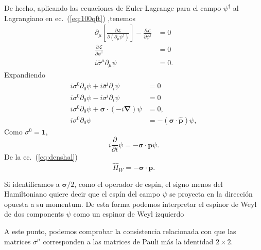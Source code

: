 \begin{frame}
De hecho, aplicando las ecuaciones de Euler-Lagrange para el campo $\psi^\dagger$ al Lagrangiano en ec.~(\ref{eq:100qft}) ,tenemos
\begin{align}
  \partial_\mu\left[\frac{\partial\mathcal{L}}{\partial\left(\partial_\mu\psi^\dagger\right)}\right]-\frac{\partial\mathcal{L}}{\partial\psi^\dagger}&=0\nonumber\\
  \frac{\partial\mathcal{L}}{\partial\psi^\dagger}&=0\nonumber\\
  \label{eq:114qftm}
  i \overline{\sigma}^\mu\partial_\mu\psi&=0.
\end{align}
Expandiendo
\begin{align*}
    i \sigma^0\partial_0\psi+i \overline{\sigma}^i\partial_i\psi&=0\\
  i \sigma^0\partial_0\psi-i \sigma^i\partial_i\psi&=0\\
  i \sigma^0\partial_0\psi+\boldsymbol\sigma\cdot(-i\boldsymbol{\nabla})\psi&=0,\\
  i \sigma^0\partial_0\psi&=-(\boldsymbol\sigma\cdot\hat{\boldsymbol{p}})\psi,
\end{align*}
Como $\sigma^0=\boldsymbol{1}$,
\begin{equation}
  \label{eq:wspinorL}
    i\frac{\partial}{\partial t}\psi=-\boldsymbol\sigma\cdot\boldsymbol{p}\psi.
\end{equation}
De la ec.~(\ref{eq:denshal})
\begin{equation}
  \label{eq:186qft}
  \hat{H}_{W}= -\boldsymbol\sigma\cdot\boldsymbol{p}.
\end{equation}
\end{frame}
Si identificamos a $\boldsymbol{\sigma}/2$, como el operador de espín, el signo menos del Hamiltoniano quiere decir que el espín del campo $\psi$ se proyecta en la dirección opuesta a su momentum. 
De esta forma podemos interpretar el espinor de Weyl de dos components $\psi$ como un espinor de Weyl izquierdo


A este punto, podemos comprobar la consistencia relacionada con que las matrices $\overline{\sigma}^\mu$ corresponden a las matrices de Pauli más la identidad $2\times2$.

